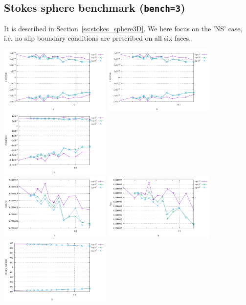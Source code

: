 \subsection*{Stokes sphere benchmark ({\tt bench=3})}

It is described in Section~\ref{ss:stokes_sphere3D}. We here focus on the 'NS' case, i.e. no slip 
boundary conditions are prescribed on all six faces.

\begin{center}
\includegraphics[width=5.5cm]{python_codes/fieldstone_81/results/bench3/u}
\includegraphics[width=5.5cm]{python_codes/fieldstone_81/results/bench3/v}
\includegraphics[width=5.5cm]{python_codes/fieldstone_81/results/bench3/w}\\
\includegraphics[width=5.5cm]{python_codes/fieldstone_81/results/bench3/vel}
\includegraphics[width=5.5cm]{python_codes/fieldstone_81/results/bench3/vrms}
\includegraphics[width=5.5cm]{python_codes/fieldstone_81/results/bench3/press}
\end{center}




















 
